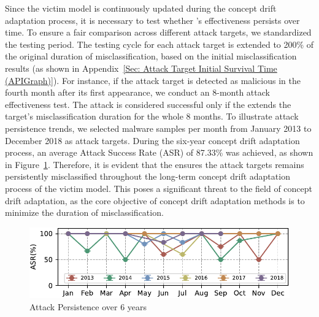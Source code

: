 Since the victim model is continuously updated during the concept drift adaptation process, it is necessary to test whether \pandora's effectiveness persists over time.
To ensure a fair comparison across different attack targets, we standardized the testing period.
The testing cycle for each attack target is extended to 200\% of the original duration of misclassification, based on the initial misclassification results (as shown in Appendix~\ref{Sec: Attack Target Initial Survival Time (APIGraph)}).
For instance, if the attack target is detected as malicious in the fourth month after its first appearance, we conduct an 8-month attack effectiveness test.
The attack is considered successful only if the \pandora extends the target’s misclassification duration for the whole 8 months.
To illustrate attack persistence trends, we selected malware samples per month from January 2013 to December 2018 as attack targets.
During the six-year concept drift adaptation process, an average Attack Success Rate (ASR) of 87.33\% was achieved, as shown in Figure~\ref{fig:Attack Persistence-APIGraph}.
Therefore, it is evident that the \pandora ensures the attack targets remains persistently misclassified throughout the long-term concept drift adaptation process of the victim model.
This poses a significant threat to the field of concept drift adaptation, as the core objective of concept drift adaptation methods is to minimize the duration of misclassification.
\begin{figure}[h!]
	\centering
	\includegraphics[width=\linewidth,keepaspectratio]{Graph/Evaluation/Figure9-update.pdf}
	\caption{Attack Persistence over 6 years }
	\label{fig:Attack Persistence-APIGraph}
\end{figure}

